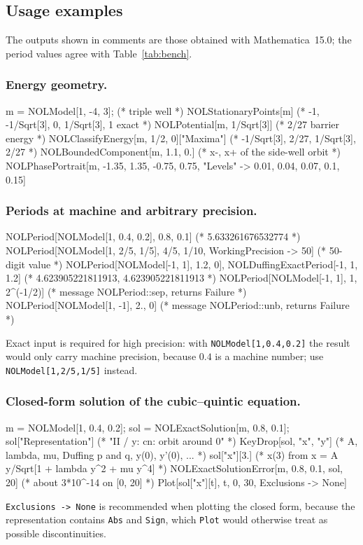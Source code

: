 \documentclass[11pt]{article}
\begin{document}
\subsection{Usage examples}
The outputs shown in comments are those obtained with Mathematica~15.0; the period values agree with Table~\ref{tab:bench}.

\subsubsection*{Energy geometry.}
\begin{wlcode}
m = NOLModel[1, -4, 3];                 (* triple well *)
NOLStationaryPoints[m]                  (* {-1, -1/Sqrt[3], 0, 1/Sqrt[3], 1}   exact *)
NOLPotential[m, 1/Sqrt[3]]              (* 2/27   barrier energy *)
NOLClassifyEnergy[m, 1/2, 0]["Maxima"]  (* {{-1/Sqrt[3], 2/27}, {1/Sqrt[3], 2/27}} *)
NOLBoundedComponent[m, 1.1, 0.]         (* {x-, x+} of the side-well orbit *)
NOLPhasePortrait[m, {-1.35, 1.35}, {-0.75, 0.75}, "Levels" -> {0.01, 0.04, 0.07, 0.1, 0.15}]
\end{wlcode}

\subsubsection*{Periods at machine and arbitrary precision.}
\begin{wlcode}
NOLPeriod[NOLModel[1, 0.4, 0.2], 0.8, 0.1]                       (* 5.633261676532774 *)
NOLPeriod[NOLModel[1, 2/5, 1/5], 4/5, 1/10, WorkingPrecision -> 50]  (* 50-digit value *)
{NOLPeriod[NOLModel[-1, 1], 1.2, 0], NOLDuffingExactPeriod[-1, 1, 1.2]}
                                    (* {4.623905221811913, 4.623905221811913} *)
NOLPeriod[NOLModel[-1, 1], 1, 2^(-1/2)]   (* message NOLPeriod::sep, returns Failure *)
NOLPeriod[NOLModel[1, -1], 2., 0]         (* message NOLPeriod::unb, returns Failure *)
\end{wlcode}
Exact input is required for high precision: with \texttt{NOLModel[1,0.4,0.2]} the result would only carry machine precision, because $0.4$ is a machine number; use \texttt{NOLModel[1,2/5,1/5]} instead.

\subsubsection*{Closed-form solution of the cubic--quintic equation.}
\begin{wlcode}
m   = NOLModel[1, 0.4, 0.2];
sol = NOLExactSolution[m, 0.8, 0.1];
sol["Representation"]           (* "II / y: cn: orbit around 0" *)
KeyDrop[sol, {"x", "y"}]        (* A, lambda, mu, Duffing p and q, y(0), y'(0), ... *)
sol["x"][3.]                    (* x(3) from x = A y/Sqrt[1 + lambda y^2 + mu y^4] *)
NOLExactSolutionError[m, 0.8, 0.1, sol, 20]   (* about 3*10^-14 on [0, 20] *)
Plot[sol["x"][t], {t, 0, 30}, Exclusions -> None]
\end{wlcode}
\texttt{Exclusions -> None} is recommended when plotting the closed form, because the representation contains \texttt{Abs} and \texttt{Sign}, which \texttt{Plot} would otherwise treat as possible discontinuities.
\end{document}
